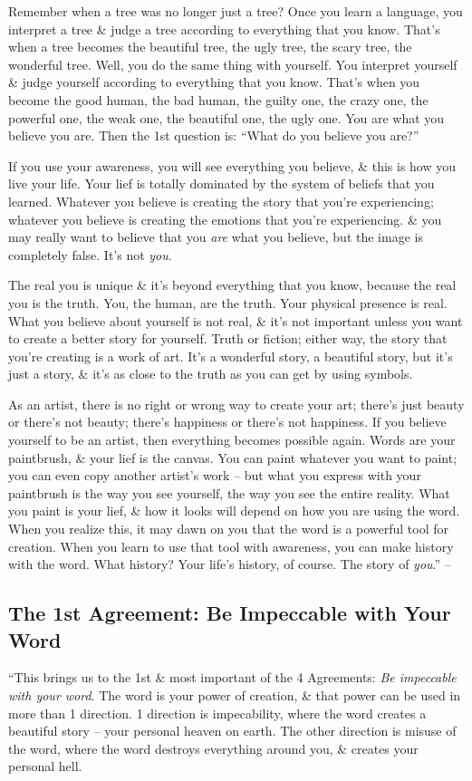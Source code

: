 \documentclass{article}
\numberwithin{equation}{section}
\begin{document}
Remember when a tree was no longer just a tree? Once you learn a language, you interpret a tree \& judge a tree according to everything that you know. That's when a tree becomes the beautiful tree, the ugly tree, the scary tree, the wonderful tree. Well, you do the same thing with yourself. You interpret yourself \& judge yourself according to everything that you know. That's when you become the good human, the bad human, the guilty one, the crazy one, the powerful one, the weak one, the beautiful one, the ugly one. You are what you believe you are. Then the 1st question is: ``What do you believe you are?''

If you use your awareness, you will see everything you believe, \& this is how you live your life. Your lief is totally dominated by the system of beliefs that you learned. Whatever you believe is creating the story that you're experiencing; whatever you believe is creating the emotions that you're experiencing. \& you may really want to believe that you \textit{are} what you believe, but the image is completely false. It's not \textit{you}.

The real you is unique \& it's beyond everything that you know, because the real you is the truth. You, the human, are the truth. Your physical presence is real. What you believe about yourself is not real, \& it's not important unless you want to create a better story for yourself. Truth or fiction; either way, the story that you're creating is a work of art. It's a wonderful story, a beautiful story, but it's just a story, \& it's as close to the truth as you can get by using symbols.

As an artist, there is no right or wrong way to create your art; there's just beauty or there's not beauty; there's happiness or there's not happiness. If you believe yourself to be an artist, then everything becomes possible again. Words are your paintbrush, \& your lief is the canvas. You can paint whatever you want to paint; you can even copy another artist's work -- but what you express with your paintbrush is the way you see yourself, the way you see the entire reality. What you paint is your lief, \& how it looks will depend on how you are using the word. When you realize this, it may dawn on you that the word is a powerful tool for creation. When you learn to use that tool with awareness, you can make history with the word. What history? Your life's history, of course. The story of \textit{you}.'' -- \cite[pp. 35--37]{Ruiz_Ruiz2011}

\subsection{The 1st Agreement: Be Impeccable with Your Word}
``This brings us to the 1st \& most important of the 4 Agreements: \textit{Be impeccable with your word}. The word is your power of creation, \& that power can be used in more than 1 direction. 1 direction is impecability, where the word creates a beautiful story -- your personal heaven on earth. The other direction is misuse of the word, where the word destroys everything around you, \& creates your personal hell.
\end{document}
